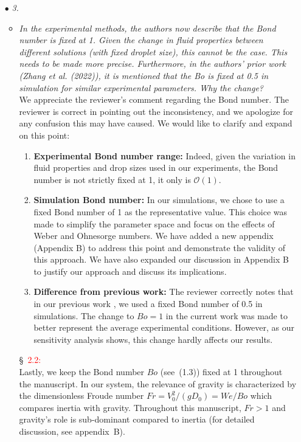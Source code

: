 \documentclass[]{article}
\newcommand*\red{\textcolor{red}}
\newcommand{\oo}{\color{magenta} \normalfont}
\newcommand{\bb}{\color{black} \normalfont}
\begin{document}
\begin{enumerate}
	\item[$\bullet$] \textit{3.}
	\begin{itemize}
		\renewcommand\labelitemi{--}
		\item \textit{In the experimental methods, the authors now describe that the Bond number is fixed at 1. Given the change in fluid properties between different solutions (with fixed droplet size), this cannot be the case. This needs to be made more precise. Furthermore, in the authors' prior work (Zhang et al. (2022)), it is mentioned that the Bo is fixed at 0.5 in simulation for similar experimental parameters. Why the change?}\\[1mm]
		
		We appreciate the reviewer's comment regarding the Bond number. 
		The reviewer is correct in pointing out the inconsistency, and we apologize for any confusion this may have caused. We would like to clarify and expand on this point:

		\begin{enumerate}
			\item \textbf{Experimental Bond number range:}
			Indeed, given the variation in fluid properties and drop sizes used in our experiments, the Bond number is not strictly fixed at 1, it only is $\mathcal{O}\left(1\right)$.
			\item \textbf{Simulation Bond number:}
			In our simulations, we chose to use a fixed Bond number of 1 as the representative value. This choice was made to simplify the parameter space and focus on the effects of Weber and Ohnesorge numbers. We have added a new appendix (Appendix B) to address this point and demonstrate the validity of this approach. We have also expanded our discussion in Appendix B to justify our approach and discuss its implications.
			\item \textbf{Difference from previous work:}
			The reviewer correctly notes that in our previous work \citep{zhang2022impact}, we used a fixed Bond number of 0.5 in simulations. The change to $Bo = 1$ in the current work was made to better represent the average experimental conditions. However, as our sensitivity analysis shows, this change hardly affects our results.
		\end{enumerate}		
		
		\S~\red{2.2:}\\
		\oo
		Lastly, we keep the Bond number $Bo$ (see~(1.3)) fixed at 1 throughout the manuscript. In our system, the relevance of gravity is characterized by the dimensionless Froude number $Fr = V_0^2/(gD_0) = We/Bo$ which compares inertia with gravity. Throughout this manuscript, $Fr > 1$ and gravity's role is sub-dominant compared to inertia (for detailed discussion, see appendix~B).
		\bb
		

\end{itemize}
\end{enumerate}
\end{document}
